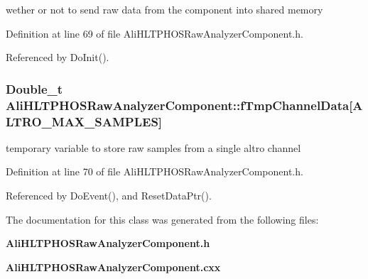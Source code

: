 wether or not to send raw data from the component into shared memory 

Definition at line 69 of file Ali\-HLTPHOSRaw\-Analyzer\-Component.h.

Referenced by Do\-Init().
\subsubsection{\setlength{\rightskip}{0pt plus 5cm}Double\_\-t {\bf Ali\-HLTPHOSRaw\-Analyzer\-Component::f\-Tmp\-Channel\-Data}[ALTRO\_\-MAX\_\-SAMPLES]\hspace{0.3cm}{\tt  [private]}}\label{classAliHLTPHOSRawAnalyzerComponent_r8}


temporary variable to store raw samples from a single altro channel 

Definition at line 70 of file Ali\-HLTPHOSRaw\-Analyzer\-Component.h.

Referenced by Do\-Event(), and Reset\-Data\-Ptr().

The documentation for this class was generated from the following files:\begin{CompactItemize}
\item 
{\bf Ali\-HLTPHOSRaw\-Analyzer\-Component.h}\item 
{\bf Ali\-HLTPHOSRaw\-Analyzer\-Component.cxx}\end{CompactItemize}

